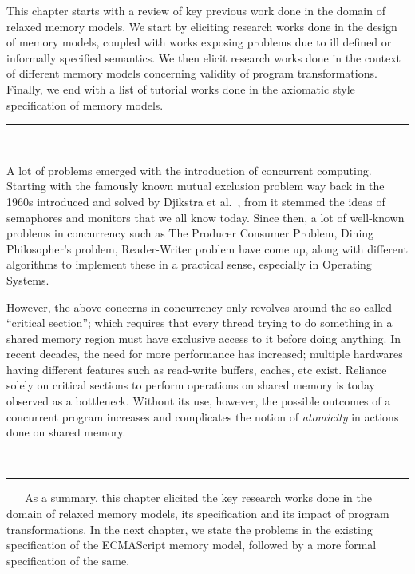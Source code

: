 This chapter starts with a review of key previous work done in the domain of relaxed memory models.
We start by eliciting research works done in the design of memory models, coupled with works exposing problems due to ill defined or informally specified semantics. 
We then elicit research works done in the context of different memory models concerning validity of program transformations. 
Finally, we end with a list of tutorial works done in the axiomatic style specification of memory models.
\ \newline
\ \newline  
\hrule 
\ \newline 
\ \newline 

A lot of problems emerged with the introduction of concurrent computing. 
Starting with the famously known mutual exclusion problem way back in the 1960s introduced and solved by Djikstra et al.~\cite{Djikstra}, from it stemmed the ideas of semaphores and monitors that we all know today.  
Since then, a lot of well-known problems in concurrency such as The Producer Consumer Problem, Dining Philosopher's problem, Reader-Writer problem have come up, along with different algorithms to implement these in a practical sense, especially in Operating Systems. 

However, the above concerns in concurrency only revolves around the so-called ``critical section''; which requires that every thread trying to do something in a shared memory region must have exclusive access to it before doing anything. 
In recent decades, the need for more performance has increased; multiple hardwares having different features such as read-write buffers, caches, etc exist. 
Reliance solely on critical sections to perform operations on shared memory is today observed as a bottleneck. 
Without its use, however, the possible outcomes of a concurrent program increases and complicates the notion of \textit{atomicity} in actions done on shared memory.






  


\ \newline
\ \newline  
\hrule 
\ \newline 
\ \newline 
As a summary, this chapter elicited the key research works done in the domain of relaxed memory models, its specification and its impact of program transformations. 
In the next chapter, we state the problems in the existing specification of the ECMAScript memory model, followed by a more formal specification of the same.